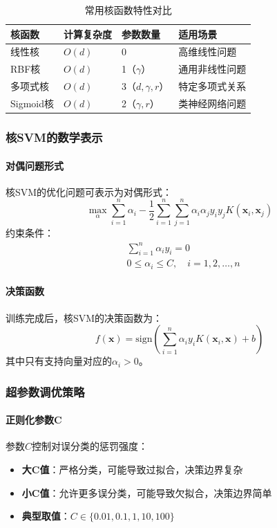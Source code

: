 \documentclass[UTF8]{report}
\theoremstyle{MyLineTheoremStyle} %
\theoremstyle{MyBlockTheoremStyle} %
\theoremstyle{MySubsubsectionStyle} %
\begin{document}
\begin{table}[h]
\centering
\caption{常用核函数特性对比}
\begin{tabular}{l p{3cm} p{3cm} p{3cm}}
\toprule
\textbf{核函数} & \textbf{计算复杂度} & \textbf{参数数量} & \textbf{适用场景} \\
\midrule
线性核 & $O(d)$ & 0 & 高维线性问题 \\
RBF核 & $O(d)$ & 1（$\gamma$） & 通用非线性问题 \\
多项式核 & $O(d)$ & 3（$d, \gamma, r$） & 特定多项式关系 \\
Sigmoid核 & $O(d)$ & 2（$\gamma, r$） & 类神经网络问题 \\
\bottomrule
\end{tabular}
\end{table}

\subsubsection{核SVM的数学表示}

\paragraph{对偶问题形式}
核SVM的优化问题可表示为对偶形式：
\begin{equation}
\max_{\alpha} \sum_{i=1}^{n}\alpha_i - \frac{1}{2}\sum_{i=1}^{n}\sum_{j=1}^{n}\alpha_i\alpha_j y_i y_j K(\mathbf{x}_i, \mathbf{x}_j)
\end{equation}
约束条件：
\begin{align}
&\sum_{i=1}^{n}\alpha_i y_i = 0 \\
&0 \leq \alpha_i \leq C, \quad i = 1, 2, \ldots, n
\end{align}

\paragraph{决策函数}
训练完成后，核SVM的决策函数为：
\begin{equation}
f(\mathbf{x}) = \text{sign}\left(\sum_{i=1}^{n}\alpha_i y_i K(\mathbf{x}_i, \mathbf{x}) + b\right)
\end{equation}
其中只有支持向量对应的$\alpha_i > 0$。

\subsubsection{超参数调优策略}

\paragraph{正则化参数C}
参数$C$控制对误分类的惩罚强度：
\begin{itemize}
    \item \textbf{大C值}：严格分类，可能导致过拟合，决策边界复杂
    \item \textbf{小C值}：允许更多误分类，可能导致欠拟合，决策边界简单
    \item \textbf{典型取值}：$C \in \{0.01, 0.1, 1, 10, 100\}$
\end{itemize}
\end{document}

